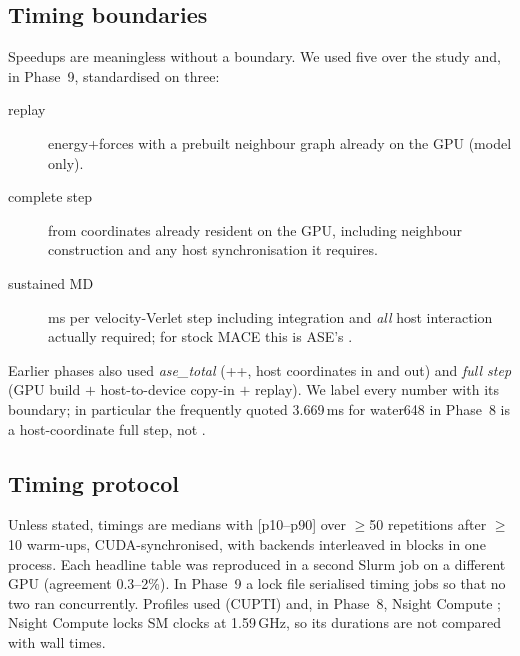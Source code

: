\subsection{Timing boundaries}
Speedups are meaningless without a boundary. We used five over the study and, in Phase~9, standardised on three:
\begin{description}
  \item[\Bone{} replay] energy+forces with a prebuilt neighbour graph already on the GPU (model only).
  \item[\Btwo{} complete step] from coordinates already resident on the GPU, including neighbour construction and any host synchronisation it requires.
  \item[\Bthree{} sustained MD] ms per velocity-Verlet step including integration and \emph{all} host interaction actually required; for stock MACE this is ASE's .
\end{description}
Earlier phases also used \emph{ase\_total} (++, host coordinates in and out) and \emph{full step} (GPU build $+$ host-to-device copy-in $+$ replay). We label every number with its boundary; in particular the frequently quoted 3.669\,ms for water648 in Phase~8 is a host-coordinate full step, not \Btwo.

\subsection{Timing protocol}
Unless stated, timings are medians with [p10--p90] over $\ge$50 repetitions after $\ge$10 warm-ups, CUDA-synchronised, with backends interleaved in blocks in one process. Each headline table was reproduced in a second Slurm job on a different GPU (agreement 0.3--2\%). In Phase~9 a lock file serialised timing jobs so that no two ran concurrently. Profiles used  (CUPTI) and, in Phase~8, Nsight Compute ; Nsight Compute locks SM clocks at 1.59\,GHz, so its durations are not compared with wall times.

